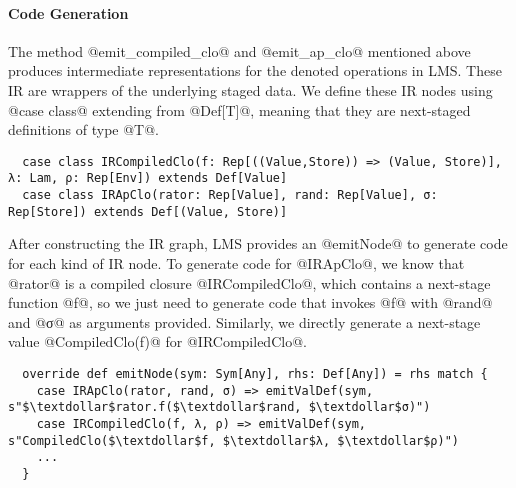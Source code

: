 \paragraph{Code Generation}

The method @emit_compiled_clo@ and @emit_ap_clo@ mentioned above produces
intermediate representations for the denoted operations in LMS. These IR are
wrappers of the underlying staged data. We define these IR nodes using
@case class@ extending from @Def[T]@, meaning that they are next-staged definitions of
type @T@.

\begin{lstlisting}
  case class IRCompiledClo(f: Rep[((Value,Store)) => (Value, Store)], λ: Lam, ρ: Rep[Env]) extends Def[Value]
  case class IRApClo(rator: Rep[Value], rand: Rep[Value], σ: Rep[Store]) extends Def[(Value, Store)]
\end{lstlisting}

After constructing the IR graph, LMS provides an @emitNode@ to generate code for
each kind of IR node. To generate code for @IRApClo@, we know that @rator@ is a
compiled closure @IRCompiledClo@, which contains a next-stage function @f@, so
we just need to generate code that invokes @f@ with @rand@ and @σ@ as arguments
provided. Similarly, we directly generate a next-stage value @CompiledClo(f)@
for @IRCompiledClo@.

\begin{lstlisting}
  override def emitNode(sym: Sym[Any], rhs: Def[Any]) = rhs match {
    case IRApClo(rator, rand, σ) => emitValDef(sym, s"$\textdollar$rator.f($\textdollar$rand, $\textdollar$σ)")
    case IRCompiledClo(f, λ, ρ) => emitValDef(sym, s"CompiledClo($\textdollar$f, $\textdollar$λ, $\textdollar$ρ)")
    ...
  }
\end{lstlisting}
